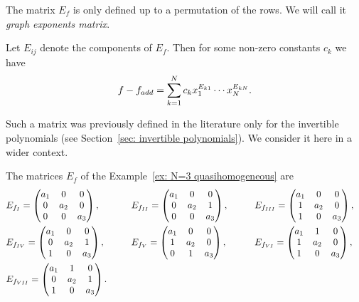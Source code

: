 \documentclass[10pt,a4paper]{article}
\numberwithin{equation}{section}
\begin{document}
The matrix $E_f$ is only defined up to a permutation of the rows. We will call it \textit{graph exponents matrix}.

Let $E_{ij}$ denote the components of $E_f$. Then for some non-zero constants $c_k$ we have
\begin{equation}\label{eq: poly from graph exponents matrix}
 	f - f_{\rm add} = \sum_{k=1}^N c_k x_1^{E_{k1}} \cdots x_N^{E_{kN}}.
\end{equation}

\begin{Remark}
	Such a matrix was previously defined in the literature only for the invertible polynomials (see Section~\ref{sec: invertible polynomials}). We consider it here in a wider context.
\end{Remark}

\begin{Example}
	The matrices $E_f$ of the Example~\ref{ex: N=3 quasihomogeneous} are
	\begin{alignat*}{4}
		& E_{f_{\rm I}} = \begin{pmatrix}
					a_1 & 0 & 0 \\ 0 & a_2 & 0 \\ 0 & 0 & a_3
		 \end{pmatrix},
		\qquad&&
		E_{f_{\rm II}} = \begin{pmatrix}
			a_1 & 0 & 0 \\ 0 & a_2 & 1 \\ 0 & 0 & a_3
			\end{pmatrix},
		\qquad&&
		E_{f_{\rm III}} = \begin{pmatrix}
			a_1 & 0 & 0 \\ 1 & a_2 & 0 \\ 1 & 0 & a_3
			\end{pmatrix},&
\\&		E_{f_{\rm IV}} = \begin{pmatrix}
			a_1 & 0 & 0 \\ 0 & a_2 & 1 \\ 1 & 0 & a_3
			\end{pmatrix},
		\qquad &&E_{f_{\rm V}} = \begin{pmatrix}
			a_1 & 0 & 0 \\ 1 & a_2 & 0 \\ 0 & 1 & a_3
			\end{pmatrix},
		\qquad&&
		E_{f_{\rm VI}} = \begin{pmatrix}
			a_1 & 1 & 0 \\ 1 & a_2 & 0 \\ 1 & 0 & a_3
			\end{pmatrix},&
		\\&
		E_{f_{\rm VII}} = \begin{pmatrix}
			a_1 & 1 & 0 \\ 0 & a_2 & 1 \\ 1 & 0 & a_3
			\end{pmatrix}.&&&&&
	\end{alignat*}
\end{Example}
\end{document}
